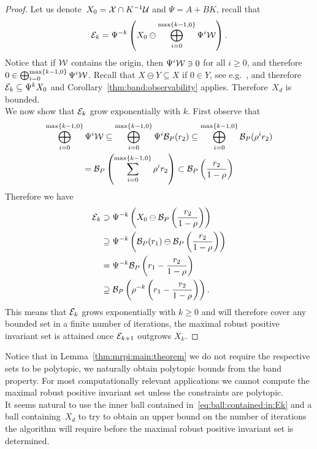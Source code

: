 \begin{proof}
Let us denote~$X_0=\mathcal X\cap K^{-1}\mathcal U$ and $\Psi=A+BK$, recall that 
%
\[
	\mathcal E_k = \Psi^{-k}\left(X_0\ominus\bigoplus_{i=0}^{\max\{k-1,0\}}\Psi^i\mathcal W\right).
\]
%
Notice that if $\mathcal W$ contains the origin, then $\Psi^i\mathcal W\ni0$ for all $i\geq0$, and therefore~$0\in\bigoplus_{i=0}^{\max\{k-1,0\}}\Psi^i\mathcal W$.
%
Recall that $X\ominus Y\subseteq X$ if $0\in Y$, see e.g.~\cite{Kolmanovsky:1998}, and therefore $\mathcal E_k\subseteq\Psi^k X_0$ and Corollary~\ref{thm:band:observability} applies.
%
Therefore~$X_d$ is bounded.
%
\\[1em]
%
We now show that $\mathcal E_k$ grow exponentially with $k$.
%
First observe that 
%
\begin{multline}
	\bigoplus_{i=0}^{\max\{k-1,0\}}\Psi^i\mathcal W\subseteq\bigoplus_{i=0}^{\max\{k-1,0\}}\Psi^i\mathcal B_P(r_2)\subseteq \bigoplus_{i=0}^{\max\{k-1,0\}} \mathcal B_P(\rho^i r_2)\\ = \mathcal B_P\left(\sum_{i=0}^{\max\{k-1,0\}}\rho^i r_2\right)\subset\mathcal B_P\left(\frac{r_2}{1-\rho}\right)
\end{multline}
%
Therefore we have
%
\begin{equation}\label{eq:ball:contained:in:Ek}\begin{aligned}
	\mathcal E_k &\supset \Psi^{-k}\left(X_0\ominus\mathcal B_P\left(\frac{r_2}{1-\rho}\right)\right)\\
	&\supseteq\Psi^{-k}\left(\mathcal B_P(r_1)\ominus\mathcal B_P\left(\frac{r_2}{1-\rho}\right)\right)\\
	&= \Psi^{-k}\mathcal B_P\left(r_1-\frac{r_2}{1-\rho}\right)\\
	&\supseteq\mathcal B_P\left(\rho^{-k}\left(r_1-\frac{r_2}{1-\rho}\right)\right).
\end{aligned}\end{equation}
%
This means that $\mathcal E_k$ grows exponentially with $k\geq0$ and will therefore cover any bounded set in a finite number of iterations, the maximal robust positive invariant set is attained once $\mathcal E_{k+1}$ outgrows $X_k$.
\end{proof}
%
\noindent Notice that in Lemma~\ref{thm:mrpi:main:theorem} we do not require the respective sets to be polytopic, we naturally obtain polytopic bounds from the band property.
%
For most computationally relevant applications we cannot compute the maximal robust positive invariant set unless the constraints are polytopic.
%
\\[1em]
%
\mysplit It seems natural to use the inner ball contained in~\eqref{eq:ball:contained:in:Ek} and a ball containing~$X_d$ to try to obtain an upper bound on the number of iterations the algorithm will require before the maximal robust positive invariant set is determined.
